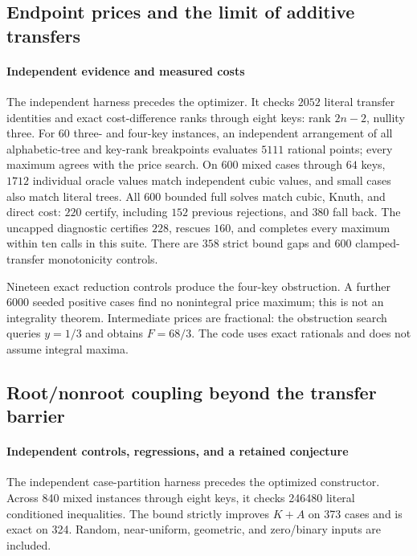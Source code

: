 \documentclass[11pt]{article}
\begin{document}
\clearpage

\subsection{Endpoint prices and the limit of additive transfers}
\paragraph{Independent evidence and measured costs}\label{sec:legacy-28-4}
The independent harness precedes the optimizer. It checks $2052$ literal
transfer identities and exact cost-difference ranks through eight keys:
rank $2n-2$, nullity three. For $60$ three- and four-key instances, an
independent arrangement of all alphabetic-tree and key-rank breakpoints
evaluates $5111$ rational points; every maximum agrees with the price search.
On $600$ mixed cases through $64$ keys, $1712$ individual oracle values
match independent cubic values, and small cases also match literal trees.
All $600$ bounded full solves match cubic, Knuth, and direct cost: $220$
certify, including $152$ previous rejections, and $380$ fall back.
The uncapped diagnostic certifies $228$, rescues $160$, and completes
every maximum within ten calls in this suite. There are $358$ strict
bound gaps and $600$ clamped-transfer monotonicity controls.

Nineteen exact reduction controls produce the four-key obstruction.
A further $6000$ seeded positive cases find no nonintegral price maximum;
this is not an integrality theorem. Intermediate prices are fractional:
the obstruction search queries $y=1/3$ and obtains $F=68/3$. The code
uses exact rationals and does not assume integral maxima.




\subsection{Root/nonroot coupling beyond the transfer barrier}
\paragraph{Independent controls, regressions, and a retained conjecture}\label{sec:legacy-29-2}
The independent case-partition harness precedes the optimized constructor.
Across 840 mixed instances through eight keys, it checks 246480 literal
conditioned inequalities. The bound strictly improves $K+A$ on 373 cases
and is exact on 324. Random, near-uniform, geometric, and zero/binary inputs
are included.
\end{document}
